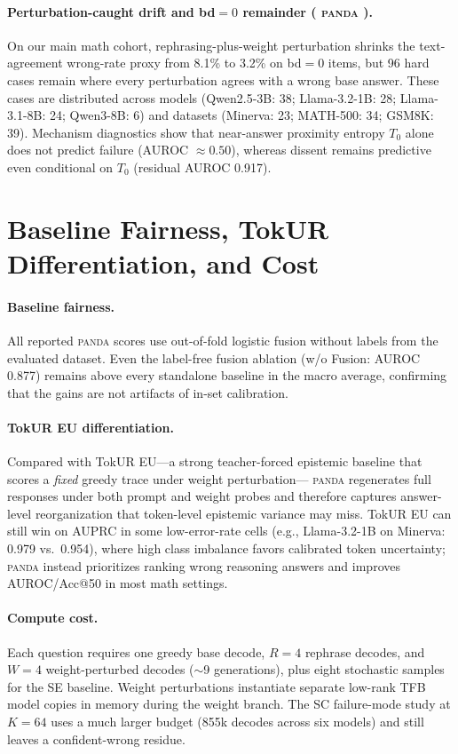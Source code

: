 \documentclass{article} %
\DeclareRobustCommand{\method}{%
  \texorpdfstring{%
    \ifmmode\text{\normalfont\textsc{panda}}\else\textsc{panda}\xspace\fi
  }{PANDA}%
}
\begin{document}
\paragraph{Perturbation-caught drift and bd$=0$ remainder (\method{}).}
On our main math cohort, rephrasing-plus-weight perturbation shrinks the text-agreement wrong-rate proxy from 8.1\% to 3.2\% on bd$=0$ items, but 96 hard cases remain where every perturbation agrees with a wrong base answer.
These cases are distributed across models (Qwen2.5-3B: 38; Llama-3.2-1B: 28; Llama-3.1-8B: 24; Qwen3-8B: 6) and datasets (Minerva: 23; MATH-500: 34; GSM8K: 39).
Mechanism diagnostics show that near-answer proximity entropy $T_0$ alone does not predict failure (AUROC $\approx 0.50$), whereas dissent remains predictive even conditional on $T_0$ (residual AUROC 0.917).


\section{Baseline Fairness, TokUR Differentiation, and Cost}
\label{app:fairness}

\paragraph{Baseline fairness.}
All reported \method{} scores use out-of-fold logistic fusion without labels from the evaluated dataset.
Even the label-free fusion ablation (w/o Fusion: AUROC 0.877) remains above every standalone baseline in the macro average, confirming that the gains are not artifacts of in-set calibration.

\paragraph{TokUR EU differentiation.}
Compared with TokUR EU---a strong teacher-forced epistemic baseline that scores a \emph{fixed} greedy trace under weight perturbation---\method{} regenerates full responses under both prompt and weight probes and therefore captures answer-level reorganization that token-level epistemic variance may miss.
TokUR EU can still win on AUPRC in some low-error-rate cells (e.g., Llama-3.2-1B on Minerva: 0.979 vs.\ 0.954), where high class imbalance favors calibrated token uncertainty; \method{} instead prioritizes ranking wrong reasoning answers and improves AUROC/Acc@50 in most math settings.

\paragraph{Compute cost.}
Each question requires one greedy base decode, $R{=}4$ rephrase decodes, and $W{=}4$ weight-perturbed decodes ($\sim$9 generations), plus eight stochastic samples for the SE baseline.
Weight perturbations instantiate separate low-rank TFB model copies in memory during the weight branch.
The SC failure-mode study at $K{=}64$ uses a much larger budget (855k decodes across six models) and still leaves a confident-wrong residue.
\end{document}
